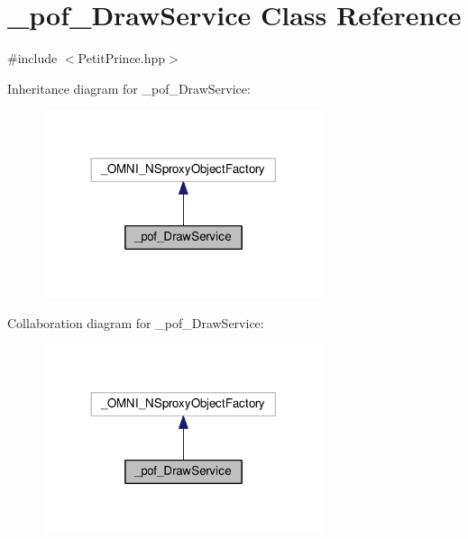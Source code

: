 \hypertarget{class__pof___draw_service}{}\section{\+\_\+pof\+\_\+\+Draw\+Service Class Reference}
\label{class__pof___draw_service}


{\ttfamily \#include $<$Petit\+Prince.\+hpp$>$}



Inheritance diagram for \+\_\+pof\+\_\+\+Draw\+Service\+:
\nopagebreak
\begin{figure}[H]
\begin{center}
\leavevmode
\includegraphics[width=233pt]{class__pof___draw_service__inherit__graph}
\end{center}
\end{figure}


Collaboration diagram for \+\_\+pof\+\_\+\+Draw\+Service\+:
\nopagebreak
\begin{figure}[H]
\begin{center}
\leavevmode
\includegraphics[width=233pt]{class__pof___draw_service__coll__graph}
\end{center}
\end{figure}

